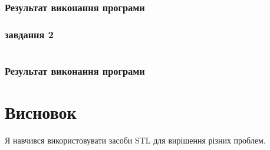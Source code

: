 \documentclass[a4paper, 12pt, oneside]{extarticle}
\begin{document}
\inputminted{c++}{1.cpp}

\subsubsection*{Результат виконання програми}



\subsubsection*{завдання 2}

\inputminted{c++}{2.cpp}

\subsubsection*{Результат виконання програми}



\section*{Висновок}

Я навчився використовувати засоби STL для вирішення
різних проблем.
\end{document}
